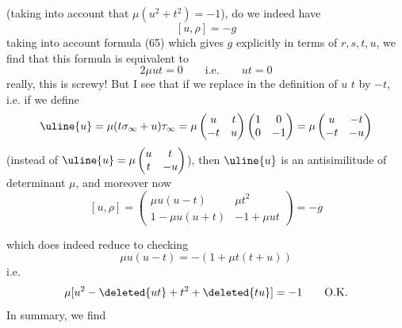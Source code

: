 (taking into account that $\mu(u^2+t^2)=-1$),  do we indeed have
\[
[u,\rho]=-g
\]
taking
into account formula (65) which gives $g$ explicitly in
terms of $r,s,t,u$, we find that this
 formula is equivalent to
\[
2\mu ut=0\qquad\text{i.e.}\qquad ut=0
\]
really, this is screwy! But I see that if we
replace in the definition of $u$ $t$ by $-t$,
i.e. if we define
\[
\uline{u}=\mu(t\sigma_\infty+u)\tau_\infty
=\mu\begin{pmatrix}u&t\\-t&u\end{pmatrix}
\begin{pmatrix}1&0\\0&-1\end{pmatrix}
=\mu\begin{pmatrix}u&-t\\-t&-u\end{pmatrix}
\]
(instead of $\uline{u}=\mu\begin{pmatrix}u&t\\t&-u\end{pmatrix}$),
then $\uline{u}$ is 
an antisimilitude of determinant $\mu$, and
moreover now
\[
[u,\rho]=\begin{pmatrix}
\mu u(u-t)&\mu t^2\\
1-\mu u(u+t)&-1+\mu ut
\end{pmatrix}=-g
\]


which does indeed reduce to checking
\[
\mu u(u-t)=-(1+\mu t(t+u))
\]
i.e.
\[
\mu[u^2-\deleted{ut}+t^2+\deleted{tu}]=-1
\qquad\text{O.K.}
\]
In summary, we find

